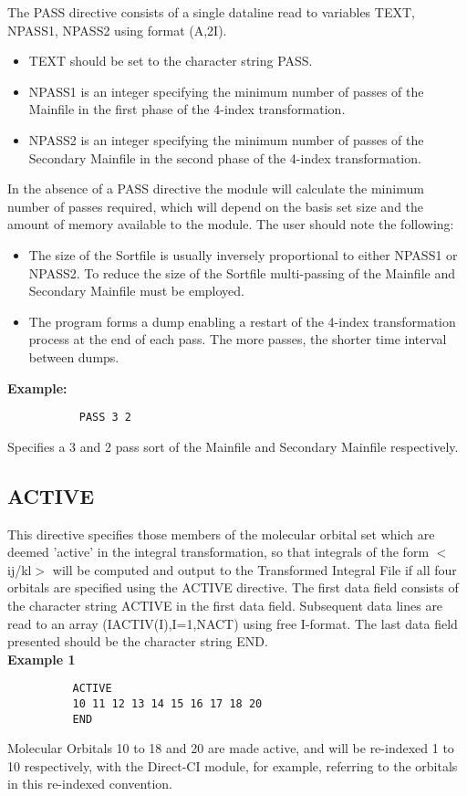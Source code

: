 \documentclass[11pt,fleqn]{article}
\begin{document}
The PASS directive consists of a single dataline read to variables 
TEXT, NPASS1, NPASS2 using format (A,2I).
\begin{itemize}
\item TEXT should be set to the character string PASS.
\item NPASS1 is an integer specifying the minimum number of passes of
the Mainfile in the first phase of the 4-index transformation.
\item NPASS2 is an integer specifying the minimum number of passes of
the Secondary Mainfile in the second phase of the 4-index
transformation.
\end{itemize}
In the absence of a PASS directive the module will calculate the
minimum number of passes required, which will depend on the basis set
size and the amount of memory available to the module. The user should
note the following:
\begin{itemize}
\item The size of the Sortfile is usually inversely proportional to
either NPASS1 or NPASS2. To reduce the size of the Sortfile
multi-passing of the Mainfile and Secondary Mainfile must be employed.
\item The program forms a dump enabling a restart of the 4-index
transformation process at the end of each pass. The more passes, the
shorter time interval between dumps.
\end{itemize}
{\bf Example:}
{
\footnotesize
\begin{verbatim}
           PASS 3 2
\end{verbatim}
}
Specifies a 3 and 2 pass sort of the Mainfile and Secondary Mainfile
respectively.

\subsection[ACTIVE]{ACTIVE}

This directive specifies those members of the molecular orbital set
which are deemed 'active' in the integral transformation, so that
integrals of the form $<$ij/kl$>$ will be computed and output to the 
Transformed Integral File if
all four orbitals are specified using the ACTIVE directive.
The first data field consists of the
character string ACTIVE in the first data field. Subsequent data lines
are read to an array (IACTIV(I),I=1,NACT) using free I-format. The last
data field presented should be the character string END.\\

{\bf Example 1}
{
\footnotesize
\begin{verbatim}
          ACTIVE
          10 11 12 13 14 15 16 17 18 20
          END
\end{verbatim}
}
Molecular Orbitals 10 to 18 and 20 are made active, and will 
be re-indexed 1 to 10  respectively, with the Direct-CI module, 
for example,   referring to the orbitals in this re-indexed convention.\\
\end{document}
